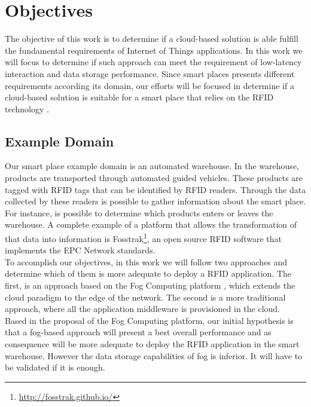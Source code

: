 \section{Objectives}
\label{section:objectives}
The objective of this work is to determine if a cloud-based solution is able fulfill the fundamental
requirements of Internet of Things applications. In this work we will focus to determine if such approach
can meet the requirement of low-latency interaction and data storage performance. Since smart places
presents different requirements according its domain, our efforts will be focused in determine if a
cloud-based solution is suitable for a smart place that relies on the RFID technology \cite{want2006introduction}.\\

\subsection{Example Domain}
\label{sub:domain}
Our smart place example domain is an automated warehouse. In the warehouse, products are transported
through automated guided vehicles. These products are tagged with \gls{RFID} tags that can be identified
by \gls{RFID} readers.  Through the data collected by these readers is possible to gather information
about the smart place. For instance, is possible to determine which products enters or leaves the
warehouse. A complete example of a platform that allows the transformation of that data into
information is Fosstrak\footnote{\url{http://fosstrak.github.io/}}, an open source \gls{RFID}
software that implements the \gls{EPC} Network standards.\\

To accomplish our objectives, in this work we will follow two approaches and determine which of them
is more adequate to deploy a \gls{RFID} application. The first, is an approach based on the Fog Computing
platform \cite{bonomi2012fog}, which extends the cloud paradigm to the edge of the network. The second
is a more traditional approach, where all the application middleware is provisioned in the cloud.\\

Based in the proposal of the Fog Computing platform, our initial hypothesis is that a fog-based approach
will present a best overall performance and as consequence will be more adequate to deploy the \gls{RFID}
application in the smart warehouse. However the data storage capabilities of fog is inferior. It will
have to be validated if it is enough.


